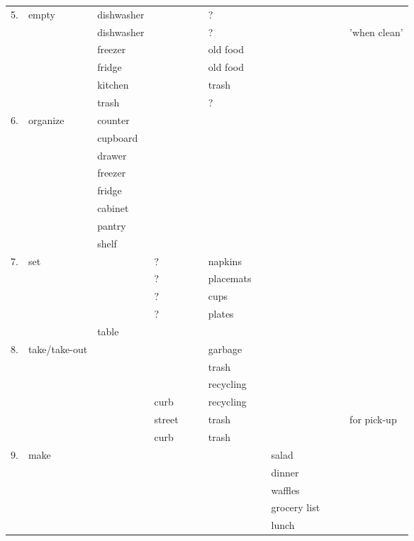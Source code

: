\documentclass[11pt]{article}
\begin{document}
\begin{center}
\begin{tabular}{r|l|llllllllll|}
\hline
5. & empty & dishwasher &  &  &  & ? &  &  &  &  & \\
 &  & dishwasher &  &  &  & ? &  &  &  &  & 'when clean'\\
 &  & freezer &  &  &  & old food &  &  &  &  & \\
 &  & fridge &  &  &  & old food &  &  &  &  & \\
 &  & kitchen &  &  &  & trash &  &  &  &  & \\
 &  & trash &  &  &  & ? &  &  &  &  & \\
\hline
6. & organize & counter &  &  &  &  &  &  &  &  & \\
 &  & cupboard &  &  &  &  &  &  &  &  & \\
 &  & drawer &  &  &  &  &  &  &  &  & \\
 &  & freezer &  &  &  &  &  &  &  &  & \\
 &  & fridge &  &  &  &  &  &  &  &  & \\
 &  & cabinet &  &  &  &  &  &  &  &  & \\
 &  & pantry &  &  &  &  &  &  &  &  & \\
 &  & shelf &  &  &  &  &  &  &  &  & \\
\hline
7. & set &  & ? &  &  & napkins &  &  &  &  & \\
 &  &  & ? &  &  & placemats &  &  &  &  & \\
 &  &  & ? &  &  & cups &  &  &  &  & \\
 &  &  & ? &  &  & plates &  &  &  &  & \\
 &  & table &  &  &  &  &  &  &  &  & \\
\hline
8. & take/take-out &  &  &  &  & garbage &  &  &  &  & \\
 &  &  &  &  &  & trash &  &  &  &  & \\
 &  &  &  &  &  & recycling &  &  &  &  & \\
 &  &  & curb &  &  & recycling &  &  &  &  & \\
 &  &  & street &  &  & trash &  &  &  &  & for pick-up\\
 &  &  & curb &  &  & trash &  &  &  &  & \\
\hline
9. & make &  &  &  &  &  &  & salad &  &  & \\
 &  &  &  &  &  &  &  & dinner &  &  & \\
 &  &  &  &  &  &  &  & waffles &  &  & \\
 &  &  &  &  &  &  &  & grocery list &  &  & \\
 &  &  &  &  &  &  &  & lunch &  &  & \\

\end{tabular}
\end{center}
\end{document}
